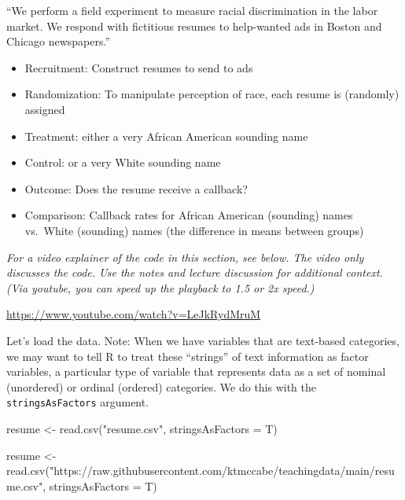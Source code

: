 \documentclass[
  letterpaper,
  DIV=11,
  numbers=noendperiod]{scrreprt}
\newenvironment{Shaded}{\begin{snugshade}}{\end{snugshade}}
\newcommand{\AttributeTok}[1]{\textcolor[rgb]{0.40,0.45,0.13}{#1}}
\newcommand{\FunctionTok}[1]{\textcolor[rgb]{0.28,0.35,0.67}{#1}}
\newcommand{\NormalTok}[1]{\textcolor[rgb]{0.00,0.23,0.31}{#1}}
\newcommand{\OtherTok}[1]{\textcolor[rgb]{0.00,0.23,0.31}{#1}}
\newcommand{\StringTok}[1]{\textcolor[rgb]{0.13,0.47,0.30}{#1}}
\providecommand{\tightlist}{%
  \setlength{\itemsep}{0pt}\setlength{\parskip}{0pt}}\usepackage{longtable,booktabs,array}
\begin{document}
``We perform a field experiment to measure racial discrimination in the
labor market. We respond with fictitious resumes to help-wanted ads in
Boston and Chicago newspapers.''

\begin{itemize}
\tightlist
\item
  Recruitment: Construct resumes to send to ads
\item
  Randomization: To manipulate perception of race, each resume is
  (randomly) assigned
\item
  Treatment: either a very African American sounding name
\item
  Control: or a very White sounding name
\item
  Outcome: Does the resume receive a callback?
\item
  Comparison: Callback rates for African American (sounding) names
  vs.~White (sounding) names (the difference in means between groups)
\end{itemize}

\emph{For a video explainer of the code in this section, see below. The
video only discusses the code. Use the notes and lecture discussion for
additional context. (Via youtube, you can speed up the playback to 1.5
or 2x speed.)}

\url{https://www.youtube.com/watch?v=LeJkRydMruM}

Let's load the data. Note: When we have variables that are text-based
categories, we may want to tell R to treat these ``strings'' of text
information as factor variables, a particular type of variable that
represents data as a set of nominal (unordered) or ordinal (ordered)
categories. We do this with the \texttt{stringsAsFactors} argument.

\begin{Shaded}
\begin{Highlighting}[]
\NormalTok{resume }\OtherTok{\textless{}{-}} \FunctionTok{read.csv}\NormalTok{(}\StringTok{"resume.csv"}\NormalTok{, }\AttributeTok{stringsAsFactors =}\NormalTok{ T)}
\end{Highlighting}
\end{Shaded}

\begin{Shaded}
\begin{Highlighting}[]
\NormalTok{resume }\OtherTok{\textless{}{-}} \FunctionTok{read.csv}\NormalTok{(}\StringTok{"https://raw.githubusercontent.com/ktmccabe/teachingdata/main/resume.csv"}\NormalTok{,}
                   \AttributeTok{stringsAsFactors =}\NormalTok{ T)}
\end{Highlighting}
\end{Shaded}
\end{document}
